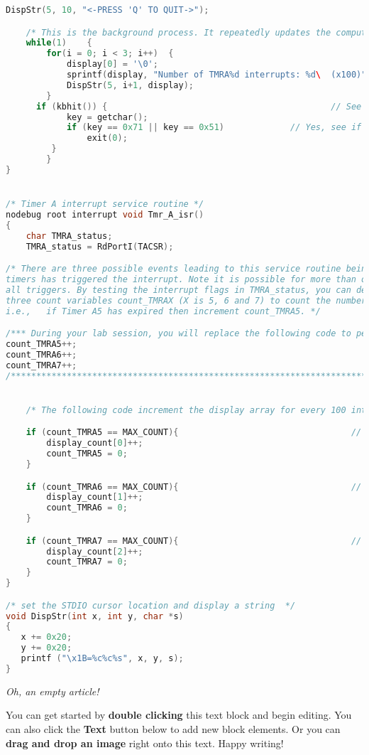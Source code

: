 \begin{lstlisting}[language=C++]
   DispStr(5, 10, "<-PRESS 'Q' TO QUIT->");

	/* This is the background process. It repeatedly updates the computer monitor with the values in the display_count array */
	while(1)	{
		for(i = 0; i < 3; i++)	{
			display[0] = '\0';
			sprintf(display, "Number of TMRA%d interrupts: %d\  (x100)",i+5, display_count[i]);
			DispStr(5, i+1, display);
		}
      if (kbhit()) {											// See if key has been pressed
			key = getchar();
			if (key == 0x71 || key == 0x51)				// Yes, see if it's the q or Q key
				exit(0);
         }
 		}
}


/* Timer A interrupt service routine */
nodebug root interrupt void Tmr_A_isr()
{
	char TMRA_status;														// This will hold the interrupt flags
	TMRA_status = RdPortI(TACSR);										// Read interrupt flags and store to TMRA_status

/* There are three possible events leading to this service routine being called. Write code to determine which of the three
timers has triggered the interrupt. Note it is possible for more than one timer to expire at the same time, thus your code must service
all triggers. By testing the interrupt flags in TMRA_status, you can determine which counters have expired. Use
three count variables count_TMRAX (X is 5, 6 and 7) to count the number of interrupts. For each Timer AX interrupt you must increment the corresponding count variable.
i.e.,	if Timer A5 has expired then increment count_TMRA5. */

/*** During your lab session, you will replace the following code to perform as specified above ***/
count_TMRA5++;
count_TMRA6++;
count_TMRA7++;
/**************************************************************************************************/


	/* The following code increment the display array for every 100 interrupts for a respective timer, and resets the count variable */

	if (count_TMRA5 == MAX_COUNT){									// if Timer A5 has interrupted the CPU 100 times
		display_count[0]++;												// increment the display counter
		count_TMRA5 = 0;													// clear the Timer A5 counter
	}

	if (count_TMRA6 == MAX_COUNT){									// if Timer A6 has interrupted the CPU 100 times
		display_count[1]++;												// increment the display counter
		count_TMRA6 = 0;													// clear the Timer A6 counter
	}

	if (count_TMRA7 == MAX_COUNT){									// if Timer A6 has interrupted the CPU 100 times
		display_count[2]++;												// increment the display counter
		count_TMRA7 = 0;													// clear the Timer A6 counter
	}
}

/* set the STDIO cursor location and display a string  */
void DispStr(int x, int y, char *s)
{
   x += 0x20;
   y += 0x20;
   printf ("\x1B=%c%c%s", x, y, s);
}
\end{lstlisting}

\textit{Oh, an empty article!} 

You can get started by \textbf{double clicking} this text block and begin editing. You can also click the \textbf{Text} button below to add new block elements. Or you can \textbf{drag and drop an image} right onto this text. Happy writing!